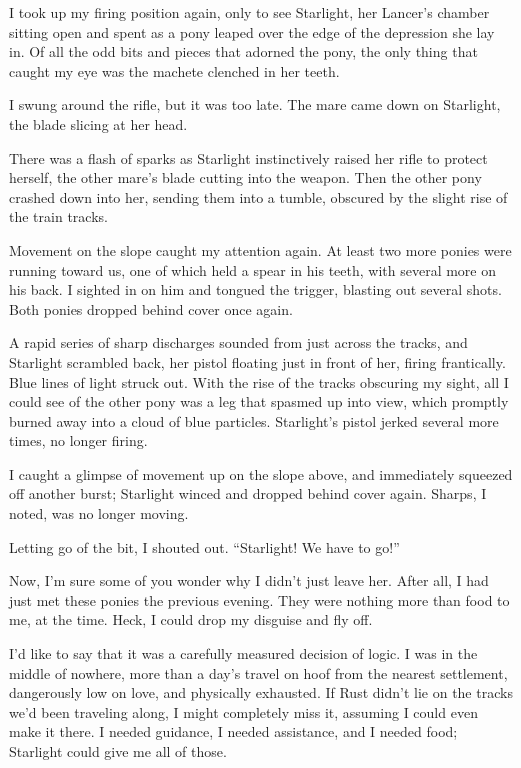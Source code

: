 I took up my firing position again, only to see Starlight, her Lancer’s chamber sitting open and spent as a pony leaped over the edge of the depression she lay in. Of all the odd bits and pieces that adorned the pony, the only thing that caught my eye was the machete clenched in her teeth.

I swung around the rifle, but it was too late. The mare came down on Starlight, the blade slicing at her head.

There was a flash of sparks as Starlight instinctively raised her rifle to protect herself, the other mare’s blade cutting into the weapon. Then the other pony crashed down into her, sending them into a tumble, obscured by the slight rise of the train tracks.

Movement on the slope caught my attention again. At least two more ponies were running toward us, one of which held a spear in his teeth, with several more on his back. I sighted in on him and tongued the trigger, blasting out several shots. Both ponies dropped behind cover once again.

A rapid series of sharp discharges sounded from just across the tracks, and Starlight scrambled back, her pistol floating just in front of her, firing frantically. Blue lines of light struck out. With the rise of the tracks obscuring my sight, all I could see of the other pony was a leg that spasmed up into view, which promptly burned away into a cloud of blue particles. Starlight’s pistol jerked several more times, no longer firing.

I caught a glimpse of movement up on the slope above, and immediately squeezed off another burst; Starlight winced and dropped behind cover again. Sharps, I noted, was no longer moving.

Letting go of the bit, I shouted out. “Starlight! We have to go!”

Now, I’m sure some of you wonder why I didn’t just leave her. After all, I had just met these ponies the previous evening. They were nothing more than food to me, at the time. Heck, I could drop my disguise and fly off.

I’d like to say that it was a carefully measured decision of logic. I was in the middle of nowhere, more than a day’s travel on hoof from the nearest settlement, dangerously low on love, and physically exhausted. If Rust didn’t lie on the tracks we’d been traveling along, I might completely miss it, assuming I could even make it there. I needed guidance, I needed assistance, and I needed food; Starlight could give me all of those.

